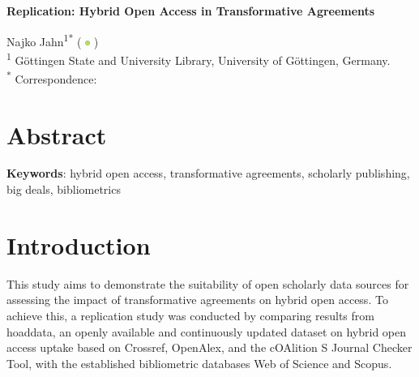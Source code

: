 \documentclass[a4paper,man,floatsintext,longtable,noextraspace,12pt]{apa6}
\begin{document}
\thispagestyle{otherpage}


\begin{large}
\textbf{Replication: Hybrid Open Access in Transformative Agreements}
\end{large}

\newcommand{\orcid}{%
  \begingroup\normalfont
  \includegraphics[height=6px]{orcid_logo.png}%
  \endgroup
}
Najko Jahn\textsuperscript{1}\textsuperscript{*} (\orcid{} \href{https://orcid.org/0000-0001-5105-1463}{\color{black}{0000-0001-5105-1463}}) \\

\textsuperscript{1} Göttingen State and University Library, University of Göttingen, Germany. \\

\textsuperscript{*} Correspondence: \href{mailto:najko.jahn@sub.uni-goettingen.de}{\color{black}{najko.jahn@sub.uni-goettingen.de}} 

\section*{Abstract}
{}
{\textbf{Keywords}: hybrid open access, transformative agreements, scholarly publishing, big deals, bibliometrics}

\newpage

\setcounter{secnumdepth}{2}

\section{Introduction}\label{introduction}

This study aims to demonstrate the suitability of open scholarly data
sources for assessing the impact of transformative agreements on hybrid
open access. To achieve this, a replication study was conducted by
comparing results from hoaddata, an openly available and continuously
updated dataset on hybrid open access uptake based on Crossref,
OpenAlex, and the cOAlition S Journal Checker Tool, with the established
bibliometric databases Web of Science and Scopus.
\end{document}
